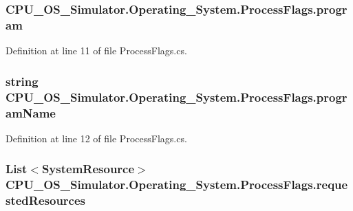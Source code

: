 \subsubsection[{program}]{ C\+P\+U\+\_\+\+O\+S\+\_\+\+Simulator.\+Operating\+\_\+\+System.\+Process\+Flags.\+program}\label{struct_c_p_u___o_s___simulator_1_1_operating___system_1_1_process_flags_addf9316ebaddcec9f466b0317d15d45c}


Definition at line 11 of file Process\+Flags.\+cs.

\hypertarget{struct_c_p_u___o_s___simulator_1_1_operating___system_1_1_process_flags_af219a7a8b99d0c94b5847797dabb39f6}{}
\subsubsection[{program\+Name}]{\setlength{\rightskip}{0pt plus 5cm}string C\+P\+U\+\_\+\+O\+S\+\_\+\+Simulator.\+Operating\+\_\+\+System.\+Process\+Flags.\+program\+Name}\label{struct_c_p_u___o_s___simulator_1_1_operating___system_1_1_process_flags_af219a7a8b99d0c94b5847797dabb39f6}


Definition at line 12 of file Process\+Flags.\+cs.

\hypertarget{struct_c_p_u___o_s___simulator_1_1_operating___system_1_1_process_flags_ace2cabaf7ca895740fa86f540424c266}{}
\subsubsection[{requested\+Resources}]{\setlength{\rightskip}{0pt plus 5cm}List$<${\bf System\+Resource}$>$ C\+P\+U\+\_\+\+O\+S\+\_\+\+Simulator.\+Operating\+\_\+\+System.\+Process\+Flags.\+requested\+Resources}\label{struct_c_p_u___o_s___simulator_1_1_operating___system_1_1_process_flags_ace2cabaf7ca895740fa86f540424c266}


